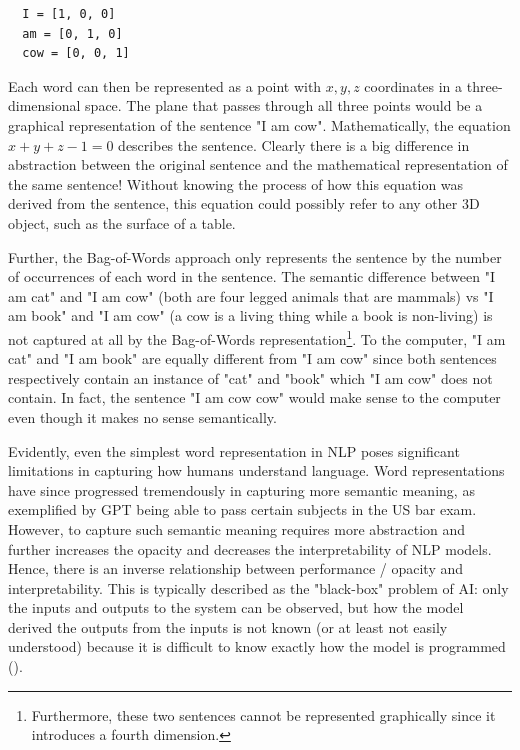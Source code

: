 \begin{lstlisting}
  I = [1, 0, 0]
  am = [0, 1, 0]
  cow = [0, 0, 1]
\end{lstlisting}

Each word can then be represented as a point with $x, y, z$ coordinates in a three-dimensional space. The plane that passes through all three points would be a graphical representation of the sentence "I am cow". Mathematically, the equation $x + y + z - 1 = 0$ describes the sentence. Clearly there is a big difference in abstraction between the original sentence and the mathematical representation of the same sentence! Without knowing the process of how this equation was derived from the sentence, this equation could possibly refer to any other 3D object, such as the surface of a table.

Further, the Bag-of-Words approach only represents the sentence by the number of occurrences of each word in the sentence. The semantic difference between "I am cat" and "I am cow" (both are four legged animals that are mammals) vs "I am book" and "I am cow" (a cow is a living thing while a book is non-living) is not captured at all by the Bag-of-Words representation\footnote{Furthermore, these two sentences cannot be represented graphically since it introduces a fourth dimension.}. To the computer, "I am cat" and "I am book" are equally different from "I am cow" since both sentences respectively contain an instance of "cat" and "book" which "I am cow" does not contain. In fact, the sentence "I am cow cow" would make sense to the computer even though it makes no sense semantically.

Evidently, even the simplest word representation in NLP poses significant limitations in capturing how humans understand language. Word representations have since progressed tremendously in capturing more semantic meaning, as exemplified by GPT being able to pass certain subjects in the US bar exam. However, to capture such semantic meaning requires more abstraction and further increases the opacity and decreases the interpretability of NLP models. Hence, there is an inverse relationship between performance / opacity and interpretability.  This is typically described as the "black-box" problem of AI: only the inputs and outputs to the system can be observed, but how the model derived the outputs from the inputs is not known (or at least not easily understood) because it is difficult to know exactly how the model is programmed (\cite{zednik2021}).


